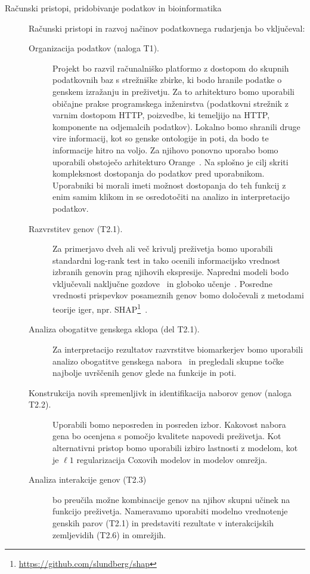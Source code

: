 \documentclass[11pt,a4paper]{article}
\newcommand{\myurl}[1]{\footnote{\url{#1}}}
\begin{document}
\begin{description}
	\item[Računski pristopi, pridobivanje podatkov in bioinformatika] Računski pristopi in razvoj načinov podatkovnega rudarjenja bo vključeval:
	\begin{description}
		\item[Organizacija podatkov (naloga T1).] Projekt bo razvil računalniško platformo z dostopom do skupnih podatkovnih baz s strežniške zbirke, ki bodo hranile podatke o genskem izražanju in preživetju. Za to arhitekturo bomo uporabili običajne prakse programskega inženirstva (podatkovni strežnik z varnim dostopom HTTP, poizvedbe, ki temeljijo na HTTP, komponente na odjemalcih podatkov). Lokalno bomo shranili druge vire informacij, kot so genske ontologije in poti, da bodo te informacije hitro na voljo. Za njihovo ponovno uporabo bomo uporabili obstoječo arhitekturo Orange~\cite{Demsar2013,Curk2005,Godec2019}. Na splošno je cilj skriti kompleksnost dostopanja do podatkov pred uporabnikom. Uporabniki bi morali imeti možnost dostopanja do teh funkcij z enim samim klikom in se osredotočiti na analizo in interpretacijo podatkov.
		\item[Razvrstitev genov (T2.1).] Za primerjavo dveh ali več krivulj preživetja bomo uporabili standardni log-rank test in tako ocenili informacijsko vrednost izbranih genovin prag njihovih ekspresije. Napredni modeli bodo vključevali naključne gozdove~\cite{22088987} in globoko učenje~\cite{katzman2018deepsurv,ching2018cox}. Posredne vrednosti prispevkov posameznih genov bomo določevali z metodami teorije iger, npr. SHAP\myurl{https://github.com/slundberg/shap}~\cite{32607472}.
		\item[Analiza obogatitve genskega sklopa (del T2.1).] Za interpretacijo rezultatov razvrstitve biomarkerjev bomo uporabili analizo obogatitve genskega nabora~\cite{1239896} in pregledali skupne točke najbolje uvrščenih genov glede na funkcije in poti.
		\item[Konstrukcija novih spremenljivk in identifikacija naborov genov (naloga T2.2).] Uporabili bomo neposreden in posreden izbor. Kakovost nabora gena bo ocenjena s pomočjo kvalitete napovedi preživetja. Kot alternativni pristop bomo uporabili izbiro lastnosti z modelom, kot je $\ell 1$ regularizacija Coxovih modelov in modelov omrežja.
		\item[Analiza interakcije genov (T2.3)] bo preučila možne kombinacije genov na njihov skupni učinek na funkcijo preživetja. Nameravamo uporabiti modelno vrednotenje genskih parov (T2.1) in predstaviti rezultate v interakcijskih zemljevidih (T2.6) in omrežjih.

\end{description}
\end{description}
\end{document}
